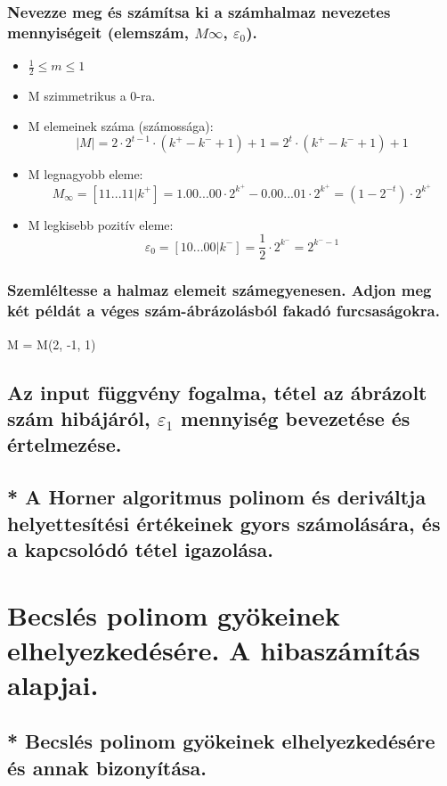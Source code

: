 \documentclass{article}
\begin{document}
            \subsubsection{Nevezze meg és számítsa ki a számhalmaz nevezetes mennyiségeit (elemszám, $M\infty$, $\varepsilon_0$).}

            \begin{itemize}
                \item $\frac{1}{2} \leq m \leq 1$
                \item M szimmetrikus a 0-ra.
                \item M elemeinek száma (számossága): \[ |M| = 2\cdot2^{t-1} \cdot (k^+-k^-+1) +1 = 2^{t} \cdot (k^+-k^-+1) +1 \]
                \item M legnagyobb eleme: \[M_\infty = [11...11|k^+] = 1.00...00\cdot2^{k^+}-0.00...01\cdot2^{k^+} = (1-2^{-t})\cdot2^{k^+}\]
                \item M legkisebb pozitív eleme: \[\varepsilon_0 = [10...00|k^-] = \frac{1}{2} \cdot 2^{k^-} = 2^{k^--1}\]
            \end{itemize}

            \subsubsection{Szemléltesse a halmaz elemeit számegyenesen. Adjon meg két példát a véges szám-ábrázolásból fakadó furcsaságokra.}
            M = M(2, -1, 1)
            

        \subsection{Az input függvény fogalma, tétel az ábrázolt szám hibájáról, $\varepsilon_1$ mennyiség bevezetése és értelmezése.}
        
        
        \subsection{* A Horner algoritmus polinom és deriváltja helyettesítési értékeinek gyors számolására, és a kapcsolódó tétel igazolása.}


    \section{Becslés polinom gyökeinek elhelyezkedésére. A hibaszámítás alapjai.}
        \subsection{* Becslés polinom gyökeinek elhelyezkedésére és annak bizonyítása.}
\end{document}
